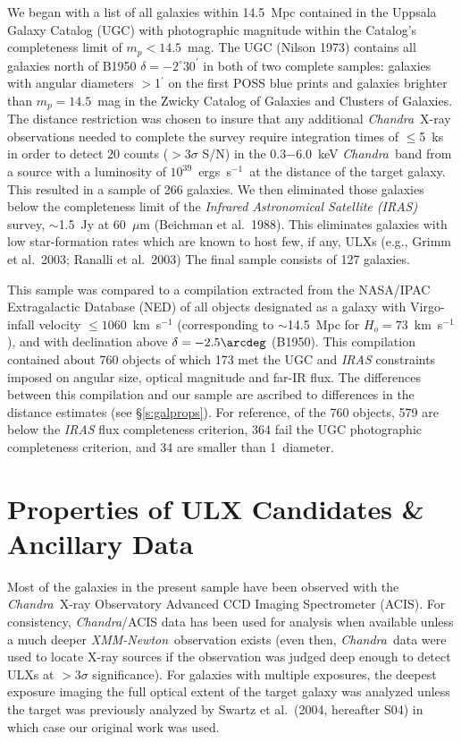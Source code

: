 \documentclass{article}
\newcommand{\ergl}{ergs~s$^{-1}$}
\newcommand{\cxo}{{\sl Chandra}}
\newcommand{\xmm}{{\sl XMM-Newton}}
\newcommand{\etal}{et al.}
\begin{document}
We began with a list of all galaxies within 14.5~Mpc 
 contained in the Uppsala Galaxy Catalog (UGC) with photographic magnitude
 within the Catalog's completeness limit of $m_p<14.5$~mag. 
The UGC (Nilson 1973)
 contains all galaxies north of B1950 $\delta=-2^{\circ}30^{\prime}$
 in both of
 two complete samples: galaxies with angular diameters $>$1$^{\prime}$ on
 the first POSS blue prints and galaxies brighter than
 $m_p=14.5$~mag in the Zwicky Catalog of Galaxies and Clusters of Galaxies.
The distance restriction was chosen to insure that any 
 additional \cxo\ X-ray observations needed to complete the survey 
 require integration times of $\le$5~ks in order to detect 20 counts 
($>$3$\sigma$ S/N) in the 0.3$-$6.0~keV \cxo\ band
from a source with a luminosity of $10^{39}$~\ergl\ at the distance 
 of the target galaxy. 
This resulted in a sample of 266 galaxies. 
We then eliminated those galaxies below the completeness limit of the 
{\sl Infrared Astronomical Satellite (IRAS)} 
 survey, $\sim$1.5~Jy at 60~$\mu$m %
(Beichman \etal\ 1988).
%
This eliminates galaxies with low star-formation rates which are known to
 host few, if any, ULXs (e.g., Grimm \etal\ 2003; Ranalli \etal\ 2003)
%
The final sample consists of 127 galaxies.

This sample was compared to a compilation extracted from 
 the NASA/IPAC Extragalactic Database (NED)
of all objects designated as a galaxy with 
Virgo-infall velocity $\le 1060$~km~s$^{-1}$
(corresponding to $\sim$14.5~Mpc for $H_o = 73$~km~s$^{-1}$),
%
and with declination above $\delta=-2.5\arcdeg$ (B1950). This compilation 
contained about 760 objects of which 173 met the UGC and {\sl IRAS} constraints 
imposed on angular size, optical magnitude and far-IR flux. 
The differences between this compilation and our sample
 are ascribed to differences in the distance estimates
(see \S \ref{s:galprops}).
For reference, of the 760 objects,
 579 are below the {\sl IRAS} flux completeness criterion,
 364 fail the UGC photographic completeness criterion,
 and 34 are smaller than 1\arcmin\ diameter.

\section{Properties of ULX Candidates \& Ancillary Data} \label{s:data}

Most of the galaxies in the present sample have been observed with 
 the \cxo\ X-ray Observatory Advanced CCD Imaging Spectrometer (ACIS).
For consistency, \cxo/ACIS data has been used for analysis when available unless a
much deeper \xmm\ observation exists (even then, \cxo\ data were used
 to locate X-ray sources if the observation was judged deep enough to detect 
 ULXs at $>$3$\sigma$ significance). 
For galaxies with multiple exposures,
 the deepest exposure imaging the full optical extent of the target galaxy
 was analyzed unless the target was previously analyzed by 
 Swartz \etal\ (2004, hereafter S04) in which case our original work was used.
\end{document}
